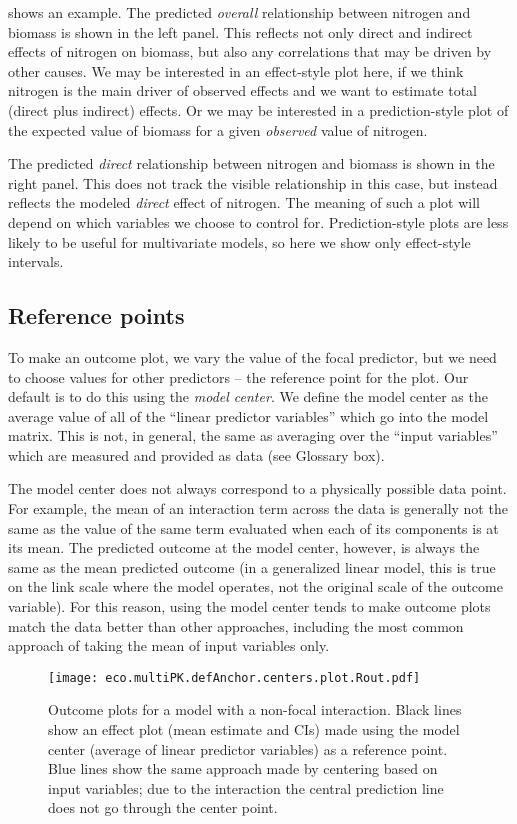 shows an example. The predicted \emph{overall} relationship between nitrogen and biomass is shown in the left panel. This reflects not only direct and indirect effects of nitrogen on biomass, but also any correlations that may be driven by other causes. We may be interested in an effect-style plot here, if we think nitrogen is the main driver of observed effects and we want to estimate total (direct plus indirect) effects. Or we may be interested in a prediction-style plot of the expected value of biomass for a given \emph{observed} value of nitrogen.

The predicted \emph{direct} relationship between nitrogen and biomass is shown in the right panel. This does not track the visible relationship in this case, but instead reflects the modeled \emph{direct} effect of nitrogen. The meaning of such a plot will depend on which variables we choose to control for. Prediction-style plots are less likely to be useful for multivariate models, so here we show only effect-style intervals.

\subsection{Reference points}

To make an outcome plot, we vary the value of the focal predictor, but we need to choose values for other predictors -- the reference point for the plot. Our default is to do this using the \emph{model center}. We define the model center as the average value of all of the “linear predictor variables” which go into the model matrix. This is not, in general, the same as averaging over the “input variables” which are measured and provided as data (see Glossary box). 

The model center does not always correspond to a physically possible data point. For example, the mean of an interaction term across the data is generally not the same as the value of the same term evaluated when each of its components is at its mean. The predicted outcome at the model center, however, is always the same as the mean predicted outcome (in a generalized linear model, this is true on the link scale where the model operates, not the original scale of the outcome variable). For this reason, using the model center tends to make outcome plots match the data better than other approaches, including the most common approach of taking the mean of input variables only.

\begin{figure}
\begin{center}
\texttt{[image: eco.multiPK.defAnchor.centers.plot.Rout.pdf]}
\end{center}
\caption{Outcome plots for a model with a non-focal interaction. Black lines show an effect plot (mean estimate and CIs) made using the model center (average of linear predictor variables) as a reference point. Blue lines show the same approach made by centering based on input variables; due to the interaction the central prediction line does not go through the center point.}
\end{figure}

